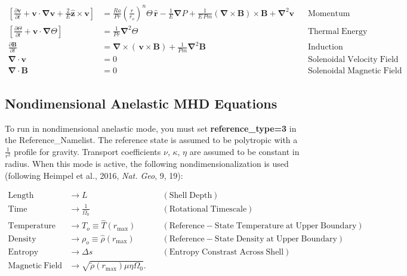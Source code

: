 \documentclass[10pt,letterpaper]{article}
\begin{document}
\begin{align*}
	\left[\frac{\partial \boldsymbol{v}}{\partial t} +\boldsymbol{v}\cdot\boldsymbol{\nabla}\boldsymbol{v}  %
	+\frac{2}{E}\boldsymbol{\hat{z}}\times\boldsymbol{v} \right]  &= %
	\frac{Ra}{Pr}\left(\frac{r}{r_o}\right)^n\Theta\,\boldsymbol{\hat{r}} %
	-\frac{1}{E}\boldsymbol{\nabla}P %
	+\frac{1}{E\,Pm}\left(\boldsymbol{\nabla}\times\boldsymbol{B}\right)\times\boldsymbol{B} %
	+\boldsymbol{\nabla}^2\boldsymbol{v} \;\;\; &\mathrm{Momentum}\\
	\left[\frac{\partial \Theta}{\partial t} +\boldsymbol{v}\cdot\boldsymbol{\nabla}\Theta \right] &=
	\frac{1}{Pr}\boldsymbol{\nabla}^2\Theta  &\mathrm{Thermal\; Energy}\\ %
	\frac{\partial \boldsymbol{B}}{\partial t} &= \boldsymbol{\nabla}\times\left(\,\boldsymbol{v}\times\boldsymbol{B}\right)+\frac{1}{Pm}\boldsymbol{\nabla}^2\boldsymbol{B} &\mathrm{Induction} \\
	\boldsymbol{\nabla}\cdot\boldsymbol{v}&=0 &\mathrm{Solenoidal\; Velocity\; Field}\\
	\boldsymbol{\nabla}\cdot\boldsymbol{B}&=0 &\mathrm{Solenoidal\; Magnetic\; Field}
\end{align*}


\subsection{Nondimensional Anelastic MHD Equations}
To run in nondimensional anelastic mode, you must set \textbf{reference\_type=3} in the Reference\_Namelist.  The reference state is assumed to be polytropic with a $\frac{1}{r^2}$ profile for gravity.  Transport coefficients $\nu$, $\kappa$, $\eta$ are assumed to be constant in radius.   When this mode is active, the following nondimensionalization is used (following Heimpel et al., 2016, \textit{Nat. Geo}, 9, 19):

\begin{align*}
	\mathrm{Length} &\rightarrow L &\;\;\;\; \mathrm{(Shell\; Depth)} \\
	\mathrm{Time} &\rightarrow   \frac{1}{\Omega_0} &\;\;\;\; \mathrm{(Rotational\; Timescale)}\\
	\mathrm{Temperature} &\rightarrow T_o\equiv\hat{T}(r_\mathrm{max})&\;\;\;\; \mathrm{(Reference-State\; Temperature\; at\; Upper\; Boundary)} \\
	\mathrm{Density} &\rightarrow \rho_o\equiv\hat{\rho}(r_\mathrm{max})&\;\;\;\; \mathrm{(Reference-State\; Density\; at\; Upper\; Boundary)} \\
	\mathrm{Entropy} &\rightarrow \Delta{s}&\;\;\;\; \mathrm{(Entropy\; Constrast\; Across\; Shell)} \\
	\mathrm{Magnetic~Field} &\rightarrow \sqrt{\tilde{\rho}(r_\mathrm{max})\mu\eta\Omega_0}.
\end{align*}
\end{document}
